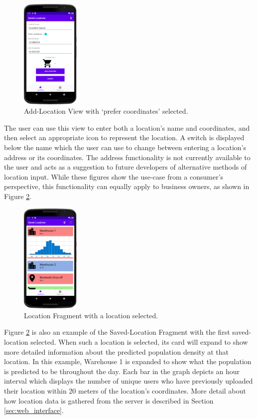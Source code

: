 \begin{figure}[ht]
    \centering
    \includegraphics[width=0.25\textwidth]{figures/EnterLocation.PNG}
    \caption{Add-Location View with `prefer coordinates' selected.}
    \label{fig:enter_location}
\end{figure}

The user can use this view to enter both a location's name and coordinates, and then select an appropriate icon to represent the location. A switch is displayed below the name which the user can use to change between entering a location's address or its coordinates. The address functionality is not currently available to the user and acts as a suggestion to future developers of alternative methods of location input. While these figures show the use-case from a consumer's perspective, this functionality can equally apply to business owners, as shown in Figure \ref{fig:business_extended}.

\begin{figure}[ht]
    \centering
    \includegraphics[width=0.25\textwidth]{figures/BusinessExtended.PNG}
    \caption{Location Fragment with a location selected.}
    \label{fig:business_extended}
\end{figure}

Figure \ref{fig:business_extended} is also an example of the Saved-Location Fragment with the first saved-location selected. When such a location is selected, its card will expand to show more detailed information about the predicted population density at that location. In this example, Warehouse 1 is expanded to show what the population is predicted to be throughout the day. Each bar in the graph depicts an hour interval which displays the number of unique users who have previously uploaded their location within 20 meters of the location's coordinates. More detail about how location data is gathered from the server is described in Section \ref{sec:web_interface}.  

